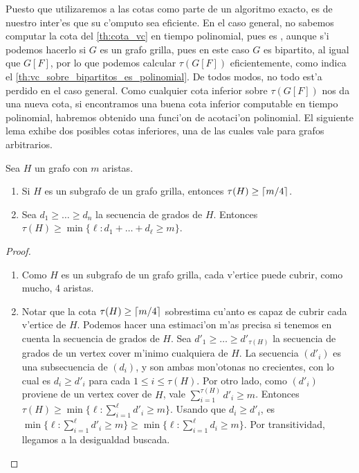 Puesto que utilizaremos a las cotas como parte de un algoritmo exacto, es de nuestro inter'es que su c'omputo sea eficiente. En el caso general, no sabemos computar la cota del \autoref{th:cota_vc} en tiempo polinomial, pues  es  \cite{Ka72}, aunque s'i podemos hacerlo si $G$ es un grafo grilla, pues en este caso $G$ es bipartito, al igual que $G[F]$, por lo que podemos calcular $\tau(G[F])$ eficientemente, como indica el \autoref{th:vc_sobre_bipartitos_es_polinomial}. De todos modos, no todo est'a perdido en el caso general. Como cualquier cota inferior sobre $\tau(G[F])$ nos da una nueva cota, si encontramos una buena cota inferior computable en tiempo polinomial, habremos obtenido una funci'on de acotaci'on polinomial. El siguiente lema exhibe dos posibles cotas inferiores, una de las cuales vale para grafos arbitrarios.

\begin{lemma}
Sea $H$ un grafo con $m$ aristas.
\begin{enumerate}
\item Si $H$ es un subgrafo de un grafo grilla, entonces $\tau(H) \geq \left\lceil m / 4 \right\rceil$.
\item Sea $d_1 \geq \dots \geq d_n$ la secuencia de grados de $H$. Entonces $\tau(H) \geq \min\{\ell : d_1 + \dots + d_{\ell} \geq m\}$.
\end{enumerate}

\begin{proof}
\begin{enumerate}
\item Como $H$ es un subgrafo de un grafo grilla, cada v'ertice puede cubrir, como mucho, 4 aristas.

\item Notar que la cota $\tau(H) \geq \left\lceil m / 4 \right\rceil$ sobrestima cu'anto es capaz de cubrir cada v'ertice de $H$. Podemos hacer una estimaci'on m'as precisa si tenemos en cuenta la secuencia de grados de $H$. Sea $d'_1 \geq \dots \geq d'_{\tau(H)}$ la secuencia de grados de un vertex cover m'inimo cualquiera de $H$. La secuencia $(d'_i)$ es una subsecuencia de $(d_i)$, y son ambas mon'otonas no crecientes, con lo cual es $d_i \geq d'_i$ para cada $1 \leq i \leq \tau(H)$. Por otro lado, como $(d'_i)$ proviene de un vertex cover de $H$, vale $\sum_{i = 1}^{\tau(H)} d'_i \geq m$. Entonces $\tau(H) \geq \min\{\ell: \sum_{i = 1}^{\ell} d'_i \geq m\}$. Usando que $d_i \geq d'_i$, es $\min\{\ell : \sum_{i = 1}^{\ell} d'_i \geq m\} \geq \min\{\ell : \sum_{i = 1}^{\ell} d_i \geq m\}$. Por transitividad, llegamos a la desigualdad buscada.
\end{enumerate}
\end{proof}
\end{lemma}


